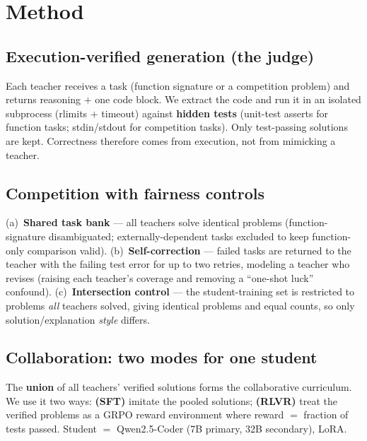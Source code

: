 \documentclass[11pt]{article}
\begin{document}
\section{Method}
\subsection{Execution-verified generation (the judge)}
Each teacher receives a task (function signature or a competition problem) and returns reasoning
$+$ one code block. We extract the code and run it in an isolated subprocess (rlimits $+$
timeout) against \textbf{hidden tests} (unit-test asserts for function tasks; stdin/stdout for
competition tasks). Only test-passing solutions are kept. Correctness therefore comes from
execution, not from mimicking a teacher.

\subsection{Competition with fairness controls}
(a)~\textbf{Shared task bank} --- all teachers solve identical problems (function-signature
disambiguated; externally-dependent tasks excluded to keep function-only comparison valid).
(b)~\textbf{Self-correction} --- failed tasks are returned to the teacher with the failing test
error for up to two retries, modeling a teacher who revises (raising each teacher's coverage and
removing a ``one-shot luck'' confound). (c)~\textbf{Intersection control} --- the
student-training set is restricted to problems \emph{all} teachers solved, giving identical
problems and equal counts, so only solution/explanation \emph{style} differs.

\subsection{Collaboration: two modes for one student}
The \textbf{union} of all teachers' verified solutions forms the collaborative curriculum. We
use it two ways: \textbf{(SFT)} imitate the pooled solutions; \textbf{(RLVR)} treat the verified
problems as a GRPO reward environment where reward $=$ fraction of tests passed. Student $=$
Qwen2.5-Coder (7B primary, 32B secondary), LoRA.
\end{document}
